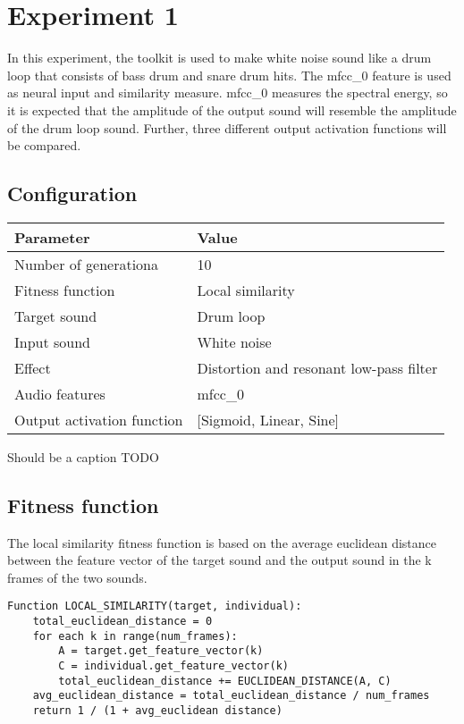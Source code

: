 \section{Experiment 1}
In this experiment, the toolkit is used to make white noise sound like a drum loop that consists of bass drum and snare drum hits. The mfcc\_0 feature is used as neural input and similarity measure. mfcc\_0 measures the spectral energy, so it is expected that the amplitude of the output sound will resemble the amplitude of the drum loop sound. Further, three different output activation functions will be compared.

\subsection{Configuration}
\begin{minipage}{\linewidth}
\centering
{} \label{tab:title} 
\begin{tabular}{ C{3.5in} C{1.6in} }\toprule[1.5pt]
\bf Parameter & \bf Value \\
\midrule
  Number of generationa & 10 \\
\midrule
  Fitness function & Local similarity \\
\midrule
  Target sound & Drum loop \\
\midrule
  Input sound & White noise \\
\midrule
  Effect & Distortion and resonant low-pass filter \\
\midrule
  Audio features & mfcc\_0 \\
\midrule
  Output activation function & [Sigmoid, Linear, Sine] \\
\bottomrule[1.25pt]
\end {tabular}\par
\bigskip
Should be a caption TODO
\end{minipage}

\subsection{Fitness function}
The local similarity fitness function is based on the average euclidean distance between the feature vector of the target sound and the output sound in the k frames of the two sounds.

\begin{verbatim}
Function LOCAL_SIMILARITY(target, individual):
    total_euclidean_distance = 0
    for each k in range(num_frames):
        A = target.get_feature_vector(k)
        C = individual.get_feature_vector(k)
        total_euclidean_distance += EUCLIDEAN_DISTANCE(A, C)
    avg_euclidean_distance = total_euclidean_distance / num_frames
    return 1 / (1 + avg_euclidean distance)
\end{verbatim}

